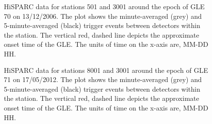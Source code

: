 \begin{figure}[ht!]
	\centering
	
	\caption{HiSPARC data for stations 501 and 3001 around the epoch of GLE 70 on 13/12/2006. The plot shows the minute-averaged (grey) and 5-minute-averaged (black) trigger events between detectors within the station. The vertical red, dashed line depicts the approximate onset time of the GLE. The units of time on the x-axis are, MM-DD HH.}
	\label{fig:GLE_70}
\end{figure}

\begin{figure}[ht!]
	\centering
	
	\caption{HiSPARC data for stations 8001 and 3001 around the epoch of GLE 71 on 17/05/2012. The plot shows the minute-averaged (grey) and 5-minute-averaged (black) trigger events between detectors within the station. The vertical red, dashed line depicts the approximate onset time of the GLE. The units of time on the x-axis are, MM-DD HH.}
	\label{fig:GLE_71}
\end{figure}

